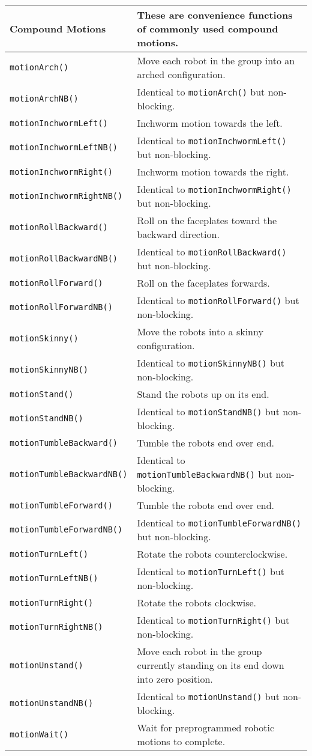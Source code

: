 \begin{tabular}{p{1.75in}p{4.5in}}
Compound Motions & These are convenience functions of commonly used compound motions. \\
\hline
\texttt{motionArch()}  & Move each robot in the group into an arched configuration. \\
\texttt{motionArchNB()}  & Identical to \texttt{motionArch()} but non-blocking. \\
\texttt{motionInchwormLeft()}  & Inchworm motion towards the left. \\
\texttt{motionInchwormLeftNB()}  & Identical to \texttt{motionInchwormLeft()} but non-blocking. \\
\texttt{motionInchwormRight()}  & Inchworm motion towards the right. \\
\texttt{motionInchwormRightNB()}  & Identical to \texttt{motionInchwormRight()} but non-blocking. \\
\texttt{motionRollBackward()}  & Roll on the faceplates toward the backward direction. \\
\texttt{motionRollBackwardNB()}  & Identical to \texttt{motionRollBackward()} but non-blocking. \\
\texttt{motionRollForward()}  & Roll on the faceplates forwards. \\
\texttt{motionRollForwardNB()}  & Identical to \texttt{motionRollForward()} but non-blocking. \\
\texttt{motionSkinny()}  & Move the robots into a skinny configuration. \\
\texttt{motionSkinnyNB()}  & Identical to \texttt{motionSkinnyNB()} but non-blocking. \\
\texttt{motionStand()}  & Stand the robots up on its end. \\
\texttt{motionStandNB()}  & Identical to \texttt{motionStandNB()} but non-blocking. \\
\texttt{motionTumbleBackward()}  & Tumble the robots end over end. \\
\texttt{motionTumbleBackwardNB()}  & Identical to \texttt{motionTumbleBackwardNB()} but non-blocking. \\
\texttt{motionTumbleForward()}  & Tumble the robots end over end. \\
\texttt{motionTumbleForwardNB()}  & Identical to \texttt{motionTumbleForwardNB()} but non-blocking. \\
\texttt{motionTurnLeft()}  & Rotate the robots counterclockwise. \\
\texttt{motionTurnLeftNB()}  & Identical to \texttt{motionTurnLeft()} but non-blocking. \\
\texttt{motionTurnRight()}  & Rotate the robots clockwise. \\
\texttt{motionTurnRightNB()}  & Identical to \texttt{motionTurnRight()} but non-blocking. \\
\texttt{motionUnstand()}  & Move each robot in the group currently standing on its end down into zero position. \\
\texttt{motionUnstandNB()}  & Identical to \texttt{motionUnstand()} but non-blocking. \\
\texttt{motionWait()}  & Wait for preprogrammed robotic motions to complete. \\
\hline
\end{tabular}
